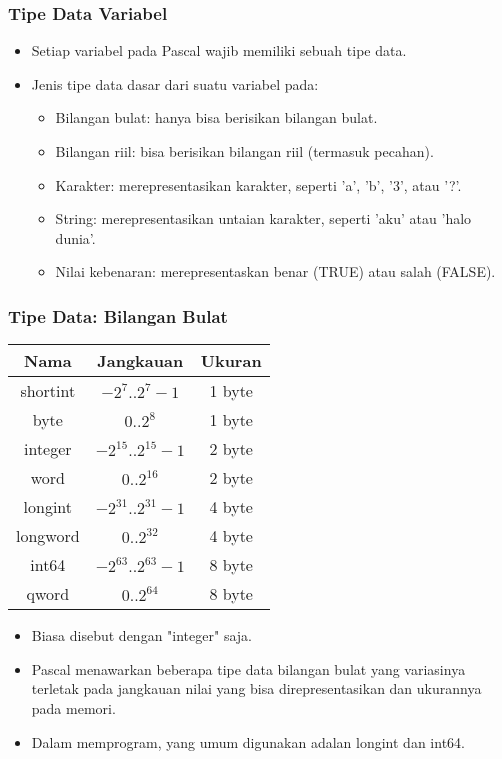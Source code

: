 \documentclass{beamer}
\begin{document}
\begin{frame}
\frametitle{Tipe Data Variabel}
\begin{itemize}
	\item Setiap variabel pada Pascal wajib memiliki sebuah \alert{tipe data}.
	\item Jenis tipe data dasar dari suatu variabel pada:
	\begin{itemize}
		\item Bilangan bulat: hanya bisa berisikan bilangan bulat.
		\item Bilangan riil: bisa berisikan bilangan riil (termasuk pecahan).
		\item Karakter: merepresentasikan karakter, seperti 'a', 'b', '3', atau '?'.
		\item String: merepresentasikan untaian karakter, seperti 'aku' atau 'halo dunia'.
		\item Nilai kebenaran: merepresentaskan benar (TRUE) atau salah (FALSE).
	\end{itemize}
\end{itemize}
\end{frame}

\begin{frame}
\frametitle{Tipe Data: Bilangan Bulat}
\begin{tabular}{|c|c|c|}
	\hline Nama  & Jangkauan  & Ukuran \\ 
	\hline shortint & $-2^7 .. 2^7-1$ & 1 byte \\ 
	\hline byte & $0 .. 2^8$ & 1 byte\\ 
	\hline integer & $-2^{15} .. 2^{15}-1$ & 2 byte\\ 
	\hline word & $0 .. 2^{16}$ & 2 byte\\ 
	\hline longint & $-2^{31} .. 2^{31}-1$ & 4 byte\\ 
	\hline longword & $0 .. 2^{32}$ & 4 byte\\ 
	\hline int64 & $-2^{63} .. 2^{63}-1$ & 8 byte\\ 
	\hline qword & $0 .. 2^{64}$ & 8 byte\\ 
	\hline 
\end{tabular} 
\begin{itemize}
	\item Biasa disebut dengan "integer" saja.
	\item Pascal menawarkan beberapa tipe data bilangan bulat yang variasinya terletak pada jangkauan nilai yang bisa direpresentasikan dan ukurannya pada memori.
	\item Dalam memprogram, yang umum digunakan adalan \alert{longint} dan \alert{int64}.
\end{itemize}
\end{frame}
\end{document}

